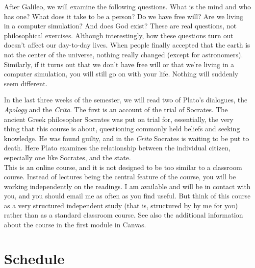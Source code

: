 \documentclass[11pt,oneside]{article}
\begin{document}
After Galileo, we will examine the following questions. What is the mind and who has one? What does it take to be a person? Do we have free will? Are we living in a computer simulation? And does God exist? These are real questions, not philosophical exercises. Although interestingly, how these questions turn out doesn’t affect our day-to-day lives. When people finally accepted that the earth is not the center of the universe, nothing really changed (except for astronomers). Similarly, if it turns out that we don’t have free will or that we’re living in a computer simulation, you will still go on with your life. Nothing will suddenly seem different.

In the last three weeks of the semester, we will read two of Plato’s dialogues, the \textit{Apology} and the \textit{Crito}. The first is an account of the trial of Socrates. The ancient Greek philosopher Socrates was put on trial for, essentially, the very thing that this course is about, questioning commonly held beliefs and seeking knowledge. He was found guilty, and in the \textit{Crito} Socrates is waiting to be put to death. Here Plato examines the relationship between the individual citizen, especially one like Socrates, and the state.\\

\noindent This is an online course, and it is not designed to be too similar to a classroom course. Instead
of lectures being the central feature of the course, you will be working independently on the
readings. I am available and will be in contact with you, and you should email me as often
as you find useful. But think of this course as a very structured independent study (that
is, structured by by me for you) rather than as a standard classroom course. See also the
additional information about the course in the first module in Canvas. 




\section{Schedule}
\end{document}
